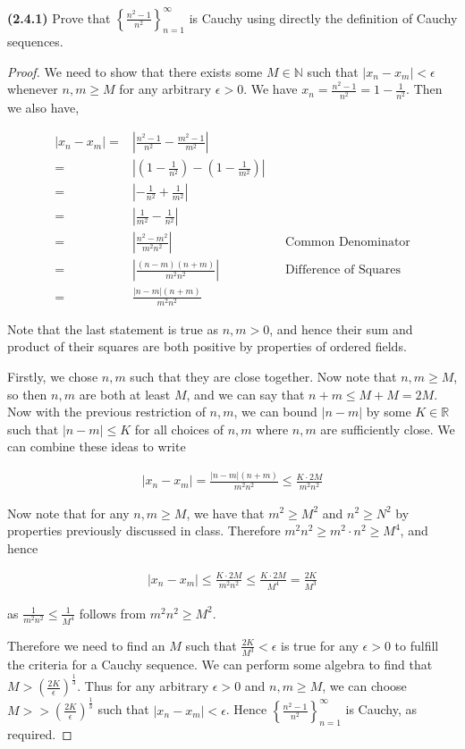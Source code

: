 \documentclass[12pt]{article}
\newcommand{\abs}[1]{\left| {#1} \right|}
\newcommand{\seq}[2][n]{\left\{ {#2} \right\}_{#1=1}^\infty}
\newcommand{\paren}[1]{\left( {#1} \right)}
\newcommand{\bR}{\mathbb{R}}
\newcommand{\bN}{\mathbb{N}}
\begin{document}
\newpage

\noindent \textbf{(2.4.1)} Prove that $\seq{\frac{n^2-1}{n^2}}$ is Cauchy using directly the definition of Cauchy sequences.

\begin{proof}
	We need to show that there exists some $M\in\bN$ such that $\abs{x_n-x_m}<\epsilon$ whenever $n,m\ge M$ for any arbitrary $\epsilon>0$. We have $x_n=\frac{n^2-1}{n^2}=1-\frac{1}{n^2}$. Then we also have,
	
\begin{align*}
	\abs{x_n-x_m}=&\abs{\frac{n^2-1}{n^2}-\frac{m^2-1}{m^2}} \\
	=&\abs{\paren{1-\frac{1}{n^2}}-\paren{1-\frac{1}{m^2}}} \\
	=&\abs{-\frac{1}{n^2}+\frac{1}{m^2}} \\
	=&\abs{\frac{1}{m^2}-\frac{1}{n^2}} \\
	=&\abs{\frac{n^2-m^2}{m^2n^2}} && \text{Common Denominator} \\
	=&\abs{\frac{(n-m)(n+m)}{m^2n^2}} && \text{Difference of Squares} \\
	=&\frac{\abs{n-m}(n+m)}{m^2n^2}
\end{align*}

\noindent Note that the last statement is true as $n,m>0$, and hence their sum and product of their squares are both positive by properties of ordered fields.

\indent Firstly, we chose $n,m$ such that they are close together. Now note that $n,m\ge M$, so then $n,m$ are both at least $M$, and we can say that $n+m\le M + M =2M$. Now with the previous restriction of $n,m$, we can bound $\abs{n-m}$ by some $K\in\bR$ such that $\abs{n-m}\le K$ for all choices of $n,m$ where $n,m$ are sufficiently close. We can combine these ideas to write

\begin{align*}
	\abs{x_n-x_m}=\frac{\abs{n-m}(n+m)}{m^2n^2}\le\frac{K\cdot2M}{m^2n^2}
\end{align*}

\indent Now note that for any $n,m\ge M$, we have that $m^2\ge M^2$ and $n^2\ge N^2$ by properties previously discussed in class. Therefore $m^2n^2\ge m^2\cdot n^2\ge M^4$, and hence

\begin{align*}
	\abs{x_n-x_m}\le\frac{K\cdot2M}{m^2n^2}\le\frac{K\cdot2M}{M^4}=\frac{2K}{M^3}
\end{align*}

\noindent as $\frac{1}{m^2n^2}\le\frac{1}{M^4}$ follows from $m^2n^2\ge M^2$.

\indent Therefore we need to find an $M$ such that $\frac{2K}{M^3}<\epsilon$ is true for any $\epsilon>0$ to fulfill the criteria for a Cauchy sequence. We can perform some algebra to find that $M>\paren{\frac{2K}{\epsilon}}^\frac{1}{3}$. Thus for any arbitrary $\epsilon>0$ and $n,m\ge M$, we can choose $M>>\paren{\frac{2K}{\epsilon}}^\frac{1}{3}$ such that $\abs{x_n-x_m}<\epsilon$. Hence $\seq{\frac{n^2-1}{n^2}}$ is Cauchy, as required.
\end{proof}
\end{document}
